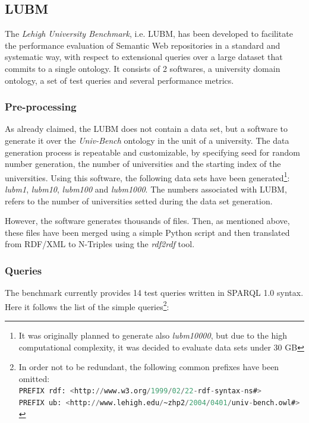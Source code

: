 \documentclass[10pt, a4paper]{report}
\begin{document}
\subsection{LUBM}

The \textit{Lehigh University Benchmark}, i.e. LUBM, has been developed to facilitate the performance evaluation of Semantic Web repositories in a standard and systematic way, with respect to extensional queries over a large dataset that commits to a single ontology\cite{lubm_dataset_paper}. It consists of 2 softwares, a university domain ontology, a set of test queries and several performance metrics.

\subsubsection{Pre-processing}

As already claimed, the LUBM does not contain a data set, but a software to generate it over the \textit{Univ-Bench}\cite{univ_ontology} ontology in the unit of a university. The data generation process is repeatable and customizable, by specifying seed for random number generation, the number of universities and the starting index of the universities.
Using this software, the following data sets have been generated\footnote{It was originally planned to generate also \textit{lubm10000}, but due to the high computational complexity, it was decided to evaluate data sets under 30 GB}: \textit{lubm1}, \textit{lubm10}, \textit{lubm100} and \textit{lubm1000}. The numbers associated with LUBM, refers to the number of universities setted during the data set generation.

However, the software generates thousands of files. Then, as mentioned above, these files have been merged using a simple Python script and then translated from RDF/XML to N-Triples using the \textit{rdf2rdf} tool.

\subsubsection{Queries}

\label{subsubsection:lubm_queries}

The benchmark currently provides 14 test queries written in SPARQL 1.0 syntax. Here it follows the list of the simple queries\footnote{In order not to be redundant, the following common prefixes have been omitted:
	\vspace{0.1cm} \\
	\hspace*{0.8cm}\lstinline[language=sql]{PREFIX rdf: <http://www.w3.org/1999/02/22-rdf-syntax-ns#>} \\
	\hspace*{0.8cm}\lstinline[language=sql]{PREFIX ub: <http://www.lehigh.edu/~zhp2/2004/0401/univ-bench.owl#>} \\
}:\\
\end{document}
